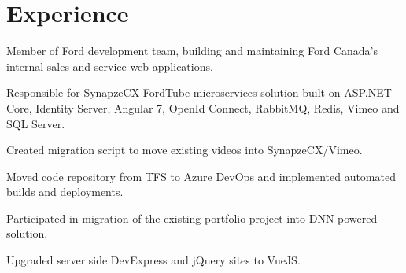 \documentclass[letterpaper]{cv_12} %
\begin{document}
\begin{minipage}[t]{0.66\textwidth}
\sectionspace%


\section{Experience}


\vspace{\topsep} %
\begin{tightitemize}
\item Member of Ford development team, building and maintaining Ford Canada's internal sales and service web applications.
\item Responsible for SynapzeCX FordTube microservices solution built on ASP.NET Core, Identity Server, Angular 7, OpenId Connect, RabbitMQ, Redis, Vimeo and SQL Server.
\item Created migration script to move existing videos into SynapzeCX/Vimeo.
\item Moved code repository from TFS to Azure DevOps and implemented automated builds and deployments.
\item Participated in migration of the existing portfolio project into DNN powered solution.
\item Upgraded server side DevExpress and jQuery sites to VueJS.\@
\end{tightitemize}

\sectionspace%


\end{minipage}


\newpage %


\lastupdated%
\end{document}

